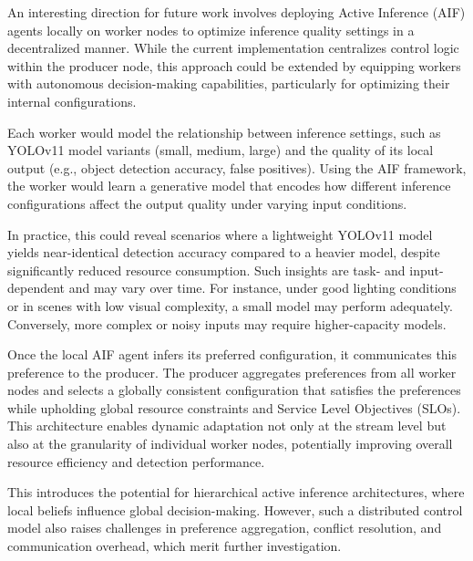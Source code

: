 An interesting direction for future work involves deploying Active Inference (AIF) agents locally on worker nodes to optimize inference quality settings in a decentralized manner. While the current implementation centralizes control logic within the producer node, this approach could be extended by equipping workers with autonomous decision-making capabilities, particularly for optimizing their internal configurations.

Each worker would model the relationship between inference settings, such as YOLOv11 model variants (small, medium, large) and the quality of its local output (e.g., object detection accuracy, false positives). Using the AIF framework, the worker would learn a generative model that encodes how different inference configurations affect the output quality under varying input conditions.

In practice, this could reveal scenarios where a lightweight YOLOv11 model yields near-identical detection accuracy compared to a heavier model, despite significantly reduced resource consumption. Such insights are task- and input-dependent and may vary over time. For instance, under good lighting conditions or in scenes with low visual complexity, a small model may perform adequately. Conversely, more complex or noisy inputs may require higher-capacity models.

Once the local AIF agent infers its preferred configuration, it communicates this preference to the producer. The producer aggregates preferences from all worker nodes and selects a globally consistent configuration that satisfies the preferences while upholding global resource constraints and Service Level Objectives (SLOs). This architecture enables dynamic adaptation not only at the stream level but also at the granularity of individual worker nodes, potentially improving overall resource efficiency and detection performance.

This introduces the potential for hierarchical active inference architectures, where local beliefs influence global decision-making. However, such a distributed control model also raises challenges in preference aggregation, conflict resolution, and communication overhead, which merit further investigation.
